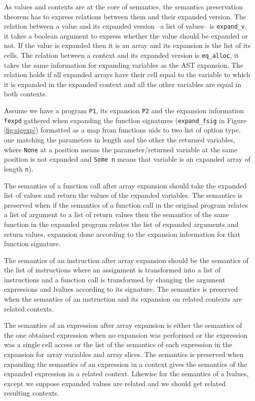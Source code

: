 \documentclass{article}
\begin{document}
As values and contexts are at the core of semantics, the semantics preservation
theorem has to express relations between them and their expanded version. The
relation between a value and its expanded version --a list of values-- is
\texttt{expand\_v}, it takes a boolean argument to express whether the value
should be expanded or not. If the value is expanded then it is an array and its
expansion is the list of its cells. The relation between a context and its
expanded version is \texttt{eq\_alloc}, it takes the same information for
expanding variables as the AST expansion. The relation holds if all expanded
arrays have their cell equal to the variable to which it is expanded in the
expanded context and all the other variables are equal in both contexts.

\medskip

Assume we have a program \texttt{P1}, its expansion \texttt{P2} and the
expansion information \texttt{fexpd} gathered when expanding the function
signatures (\texttt{expand\_fsig} in Figure \ref{fig:sigexp}) formatted as a map
from functions uids to two list of option type, one matching the parameters in
length and the other the returned variables, where \texttt{None} at a position
means the parameter/returned variable at the same position is not expanded and
\texttt{Some n} means that variable is an expanded array of length \texttt{n}).


The semantics of a function call after array expansion should take the expanded
list of values and return the values of the expanded variables. The semantics is
preserved when if the semantics of a function call in the original program
relates a list of argument to a list of return values then the semantics of the
same function in the expanded program relates the list of expanded arguments and
return values, expansion done according to the expansion information for that
function signature.

The semantics of an instruction after array expansion should be the semantics of
the list of instructions where an assignment is transformed into a list of
instructions and a function call is transformed by changing the argument
expressions and lvalues according to its signature. The semantics is
preserved when the semantics of an instruction and its expansion on related
contexts are related contexts.

\smallskip

The semantics of an expression after array expansion is either the semantics of
the one obtained expression when no expansion was performed or the expression
was a single cell access or the list of the semantics of each expression in the
expansion for array variables and array slices. The semantics is preserved when
expanding the semantics of an expression in a context gives the semantics of
the expanded expression in a related context. Likewise for the semantics of a
lvalues, except we suppose expanded values are related and we should get
related resulting contexts.
\end{document}
